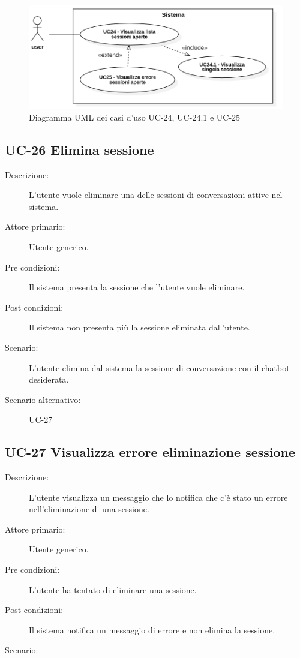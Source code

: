 \begin{figure}[H]
    \centering
    \includegraphics[width=0.8\linewidth]{UC24-25.PNG}
    \caption{Diagramma UML dei casi d'uso UC-24, UC-24.1 e UC-25}
    \label{fig:UC24-25}
\end{figure}

\subsection{UC-26 Elimina sessione}
\begin{description}
    \item[Descrizione:] L'utente vuole eliminare una delle sessioni di conversazioni attive nel sistema.
    \item[Attore primario:] Utente generico.
    \item[Pre condizioni:] Il sistema presenta la sessione che l'utente vuole eliminare.
    \item[Post condizioni:] Il sistema non presenta più la sessione eliminata dall'utente.
    \item[Scenario:] L'utente elimina dal sistema la sessione di conversazione con il chatbot desiderata.
    \item[Scenario alternativo:] UC-27
\end{description}

\subsection{UC-27 Visualizza errore eliminazione sessione }
\begin{description}
    \item[Descrizione:] L'utente visualizza un messaggio che lo notifica che c'è stato un errore nell'eliminazione di una sessione.
    \item[Attore primario:] Utente generico.
    \item[Pre condizioni:] L'utente ha tentato di eliminare una sessione.
    \item[Post condizioni:] Il sistema notifica un messaggio di errore e non elimina la sessione.
    \item[Scenario:] 
\end{description}

